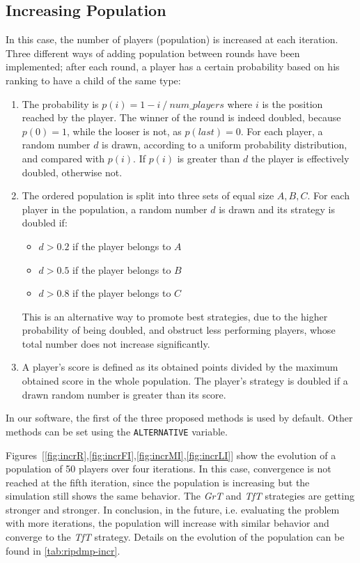 \documentclass[journal,10pt,twoside]{IEEEtran}
\begin{document}
\subsection{Increasing Population} \label{ss:rIPDMPi}
In this case, the number of players (population) is increased at each iteration. Three different ways of adding population between rounds have been implemented; after each round, a player has a certain probability based on his ranking to have a child of the same type:
\begin{enumerate}
    \item The probability is $p(i)=1- i\ /\ num\_players$ where $i$ is the position reached by the player. The winner of the round is indeed doubled, because $p(0)=1$, while the looser is not, as $p(last)=0$.
    For each player, a random number $d$ is drawn, according to a uniform probability distribution, and compared with $p(i)$. If $p(i)$ is greater than $d$ the player is effectively doubled, otherwise not.
    \item The ordered population is split into three sets of equal size $A,B,C$. For each player in the population, a random number $d$ is drawn and its strategy is doubled if:
    \begin{itemize}
        \item $d>0.2$ if the player belongs to $A$
        \item $d>0.5$ if the player belongs to $B$
        \item $d>0.8$ if the player belongs to $C$
    \end{itemize}
    This is an alternative way to promote best strategies, due to the higher probability of being doubled, and obstruct less performing players, whose total number does not increase significantly.
    \item A player's score is defined as its obtained points divided by the maximum obtained score in the whole population. The player's strategy is doubled if a drawn random number is greater than its score.
\end{enumerate}

In our software, the first of the three proposed methods is used by default. Other methods can be set using the \texttt{ALTERNATIVE} variable.

Figures~[\ref{fig:incrR},\ref{fig:incrFI},\ref{fig:incrMI},\ref{fig:incrLI}] show the evolution of a population of 50 players over four iterations. In this case, convergence is not reached at the fifth iteration, since the population is increasing but the simulation still shows the same behavior. The \textit{GrT} and \textit{TfT} strategies are getting stronger and stronger. In conclusion, in the future, i.e. evaluating the problem with more iterations, the population will increase with similar behavior and converge to the \textit{TfT} strategy. Details on the evolution of the population can be found in \autoref{tab:ripdmp-incr}.
\end{document}
